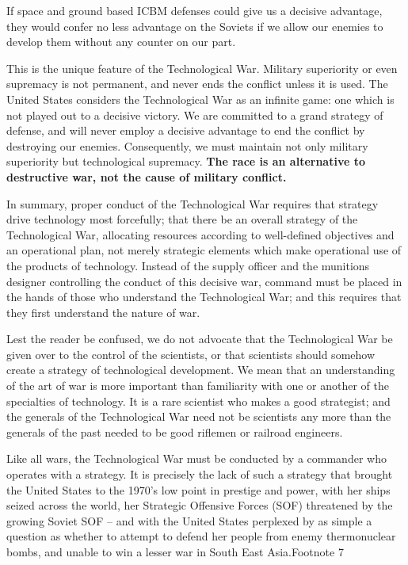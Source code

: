\documentclass[a4paper,12pt]{book}
\begin{document}
If space and ground based ICBM defenses could give us a decisive advantage, they would confer no less advantage on the Soviets if we allow our enemies to develop them without any counter on our part.

This is the unique feature of the Technological War. Military superiority or even supremacy is not permanent, and never ends the conflict unless it is used. The United States considers the Technological War as an infinite game: one which is not played out to a decisive victory. We are committed to a grand strategy of defense, and will never employ a decisive advantage to end the conflict by destroying our enemies. Consequently, we must maintain not only military superiority but technological supremacy. \textbf{The race is an alternative to destructive war, not the cause of military conflict.}

In summary, proper conduct of the Technological War requires that strategy drive technology most forcefully; that there be an overall strategy of the Technological War, allocating resources according to well-defined objectives and an operational plan, not merely strategic elements which make operational use of the products of technology. Instead of the supply officer and the munitions designer controlling the conduct of this decisive war, command must be placed in the hands of those who understand the Technological War; and this requires that they first understand the nature of war.

Lest the reader be confused, we do not advocate that the Technological War be given over to the control of the scientists, or that scientists should somehow create a strategy of technological development. We mean that an understanding of the art of war is more important than familiarity with one or another of the specialties of technology. It is a rare scientist who makes a good strategist; and the generals of the Technological War need not be scientists any more than the generals of the past needed to be good riflemen or railroad engineers.

Like all wars, the Technological War must be conducted by a commander who operates with a strategy. It is precisely the lack of such a strategy that brought the United States to the 1970's low point in prestige and power, with her ships seized across the world, her Strategic Offensive Forces (SOF) threatened by the growing Soviet SOF -- and with the United States perplexed by as simple a question as whether to attempt to defend her people from enemy thermonuclear bombs, and unable to win a lesser war in South East Asia.Footnote 7
\end{document}
